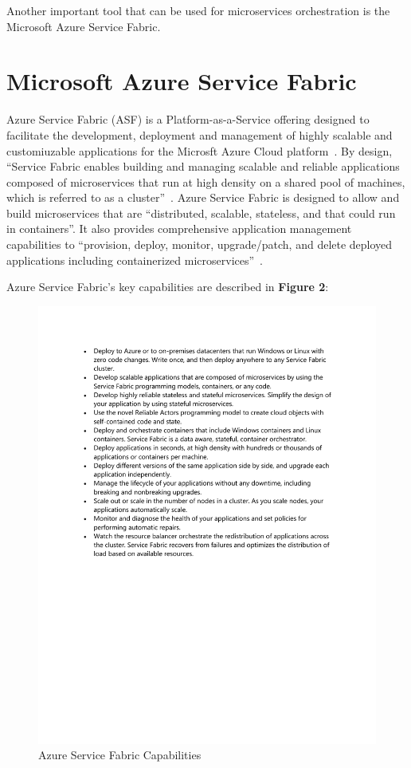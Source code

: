 Another important tool that can be used for microservices
orchestration is the Microsoft Azure Service Fabric.



\section{Microsoft Azure Service Fabric}
Azure Service Fabric (ASF) is a Platform-as-a-Service offering
designed to facilitate the development, deployment and management of
highly scalable and customiuzable applications for the Microsft Azure
Cloud platform~\cite{hid-sp18-501-definition}. By design, ``Service Fabric 
enables
building and managing scalable and reliable applications composed of
microservices that run at high density on a shared pool of machines,
which is referred to as a cluster''~\cite{hid-sp18-501-overview}. 
Azure Service Fabric is designed to allow and build microservices that are
``distributed, scalable, stateless, and that could run in containers''.
It also provides
comprehensive application management capabilities to ``provision,
deploy, monitor, upgrade/patch, and delete deployed applications
including containerized microservices''~\cite{hid-sp18-501-overview}.

Azure Service Fabric's key capabilities are described in {\bf Figure 2}:

\begin{figure}[!ht]
  \centering\includegraphics[width=\columnwidth]{images/fig2.pdf}
  \caption{Azure Service Fabric Capabilities~\cite{hid-sp18-501-overview}}
\label{f:architecture}
\end{figure}


